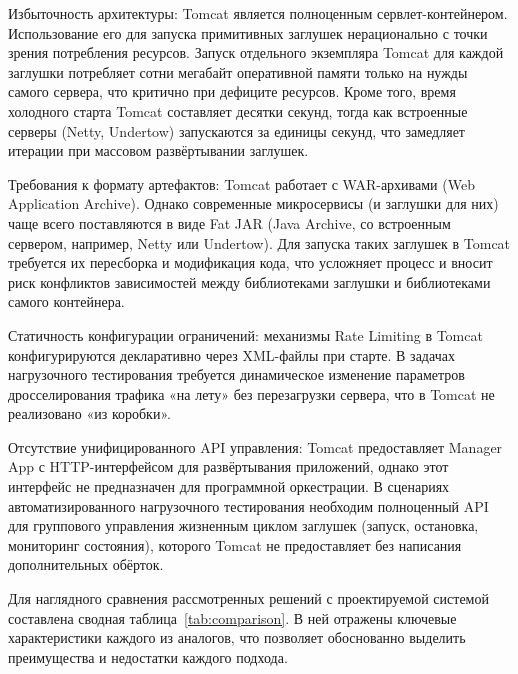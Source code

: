 \begin{compactlist}
\item Избыточность архитектуры: Tomcat является полноценным сервлет-контейнером. Использование его для запуска примитивных заглушек нерационально с точки зрения потребления ресурсов. Запуск отдельного экземпляра Tomcat для каждой заглушки потребляет сотни мегабайт оперативной памяти только на нужды самого сервера, что критично при дефиците ресурсов. Кроме того, время холодного старта Tomcat составляет десятки секунд, тогда как встроенные серверы (Netty, Undertow) запускаются за единицы секунд, что замедляет итерации при массовом развёртывании заглушек.
\item Требования к формату артефактов: Tomcat работает с WAR-архивами (Web Application Archive). Однако современные микросервисы (и заглушки для них) чаще всего поставляются в виде Fat JAR (Java Archive, со встроенным сервером, например, Netty или Undertow). Для запуска таких заглушек в Tomcat требуется их пересборка и модификация кода, что усложняет процесс и вносит риск конфликтов зависимостей между библиотеками заглушки и библиотеками самого контейнера.
\item Статичность конфигурации ограничений: механизмы Rate Limiting в Tomcat конфигурируются декларативно через XML-файлы при старте. В задачах нагрузочного тестирования требуется динамическое изменение параметров дросселирования трафика «на лету» без перезагрузки сервера, что в Tomcat не реализовано «из коробки».
\item Отсутствие унифицированного API управления: Tomcat предоставляет Manager App с HTTP-интерфейсом для развёртывания приложений, однако этот интерфейс не предназначен для программной оркестрации. В сценариях автоматизированного нагрузочного тестирования необходим полноценный API для группового управления жизненным циклом заглушек (запуск, остановка, мониторинг состояния), которого Tomcat не предоставляет без написания дополнительных обёрток.
\end{compactlist}


Для наглядного сравнения рассмотренных решений с проектируемой системой составлена сводная таблица~\ref{tab:comparison}. В ней отражены ключевые характеристики каждого из аналогов, что позволяет обоснованно выделить преимущества и недостатки каждого подхода.



